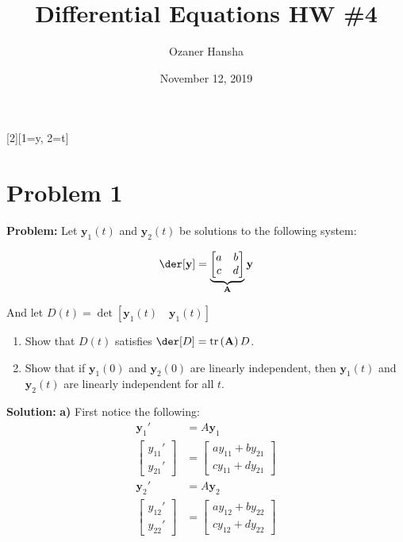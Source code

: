 \documentclass{article}
\begin{document}
\title{Differential Equations HW \#4}
\author{Ozaner Hansha}
\date{November 12, 2019}
\maketitle

[2][1=y, 2=t]{}
\newcommand*\eval[3]{\left[#1\right]_{#2}^{#3}}
\renewcommand{\vec}[1]{\mathbf{#1}}
\newcommand*\tr[1]{\text{tr}\left(#1\right)}

\section*{Problem 1}
\noindent\textbf{Problem:} Let $\vec y_1(t)$ and $\vec y_2(t)$ be solutions to the following system:

\begin{equation*}
  \der[\vec y]=\underbrace{\begin{bmatrix}
    a&b\\c&d
  \end{bmatrix}}_{\vec A}\vec y
\end{equation*}

And let $D(t)=\det[\vec y_1(t)\quad\vec y_1(t)]$

\begin{enumerate}[label=\textbf{\alph*})]
  \item Show that $D(t)$ satisfies $\der[D]=\tr{\vec A} D$.
  \item Show that if $\vec y_1(0)$ and $\vec y_2(0)$ are linearly independent, then $\vec y_1(t)$ and $\vec y_2(t)$ are linearly independent for all $t$.
\end{enumerate}
\bigskip

\noindent\textbf{Solution:} \textbf{a)} First notice the following:
\begin{align*}
  \vec y_1'&=A\vec y_1\\
  \begin{bmatrix}
    y_{11}'\\y_{21}'
  \end{bmatrix}&=\begin{bmatrix}
    ay_{11}+by_{21}\\cy_{11}+dy_{21}
  \end{bmatrix}\tag{Eq. 1}\\
  \vec y_2'&=A\vec y_2\\
  \begin{bmatrix}
    y_{12}'\\y_{22}'
  \end{bmatrix}&=\begin{bmatrix}
    ay_{12}+by_{22}\\cy_{12}+dy_{22}
  \end{bmatrix}\tag{Eq. 2}
\end{align*}
\end{document}
